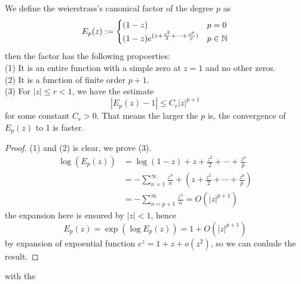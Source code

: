 \documentclass[12pt,a4paper]{article}
\begin{document}
\begin{lemma}
    We define the weierstrass's canonical factor of the degree \(p\) as
    \[E_p(z) := \begin{cases}
        (1-z) & p=0 \\
        (1-z)e^{(z + \frac{z^2}{2} + \cdots + \frac{z^p}{p})} & p \in \mathbb{N}
    \end{cases}\]
    then the factor has the following propoerties:\\
    (1) It is an entire function with a simple zero at \(z=1\) and no other zeros.\\
    (2) It is a function of finite order \(p+1\).\\
    (3) For \(|z| \leq r <1\), we have the estimate
    \[|E_p(z)-1| \leq C_r|z|^{p+1}\]
    for some constant \(C_r > 0\). That means the larger the \(p\) is, the convergence of \(E_p(z)\) to 1 is faster.
\end{lemma}
\begin{proof}
    (1) and (2) is clear, we prove (3).
    \begin{align*}
        \log(E_p(z)) &= \log(1-z) + z + \frac{z^2}{2} + \cdots + \frac{z^p}{p}  \\
        &= -\sum_{n=1}^{\infty} \frac{z^n}{n} + (z + \frac{z^2}{2} + \cdots + \frac{z^p}{p}) \\
        &= -\sum_{n=p+1}^{\infty} \frac{z^n}{n} = O(|z|^{p+1})
    \end{align*}
    the expansion here is ensured by \(|z| < 1\), hence
    \[E_p(z) = \exp(\log E_p(z)) = 1 + O(|z|^{p+1})\]
    by expansion of expoential function \(e^z = 1+z+o(z^2)\), so we can conlude the result.
\end{proof}

with the 
\end{document}

